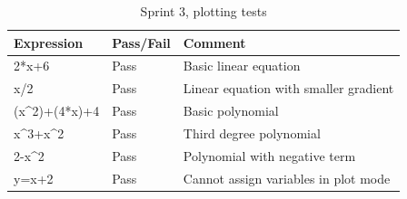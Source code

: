 \documentclass[a4paper, oneside, 11pt]{report}
\begin{document}
\begin{table}[h]
\caption{Sprint 3, plotting tests}
\label{sprint3-plotting-test}
\begin{tabular}{|l|l|l|}
\hline
\textbf{Expression} & \textbf{Pass/Fail} & \textbf{Comment}                                                                     \\ \hline
2*x+6               & Pass               & Basic linear equation                                                                \\ \hline
x/2                 & Pass               & Linear equation with smaller gradient                                                \\ \hline
(x\^{}2)+(4*x)+4    & Pass               & Basic polynomial                                                                     \\ \hline
x\^{}3+x\^{}2       & Pass               & Third degree polynomial                                                             \\ \hline
2-x\^{}2            & Pass               & Polynomial with negative term                                                       \\ \hline
y=x+2               & Pass               & Cannot assign variables in plot mode                                                \\ \hline
\end{tabular}
\end{table}

\newpage
\end{document}
